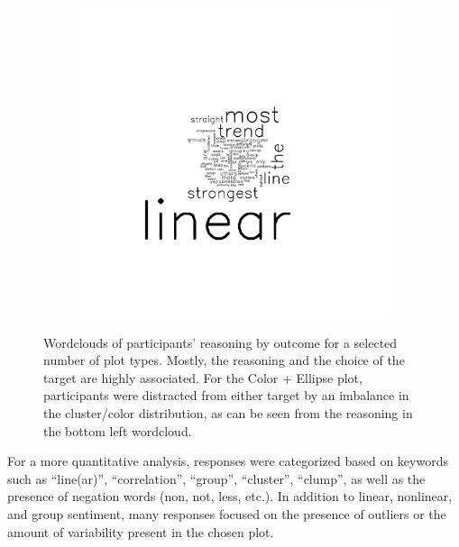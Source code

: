 \documentclass[11pt]{isuthesis}\usepackage[]{graphicx}\usepackage[]{color}
\begin{document}
\begin{figure}[ht]
\begin{subfigure}[t]{0.32\linewidth}
  \includegraphics[width=.75\linewidth]{fig-sentiment-12}
\end{subfigure}
\caption[Wordclouds of participant responses for selected plot types]{\label{fig:wordles}Wordclouds of participants' reasoning by outcome for a selected number of plot types. Mostly, the reasoning and the choice of the target are highly associated. For the Color + Ellipse plot, participants were distracted from either target by an imbalance in the cluster/color distribution, as can be seen from the reasoning in the bottom left wordcloud.}
\end{figure}
For a more quantitative analysis, responses were categorized based on keywords such as ``line(ar)'', ``correlation'', ``group'', ``cluster'', ``clump'', as well as the presence of negation words (non, not, less, etc.). In addition to linear, nonlinear, and group sentiment, many responses focused on the presence of outliers or the amount of variability present in the chosen plot. 
\end{document}
